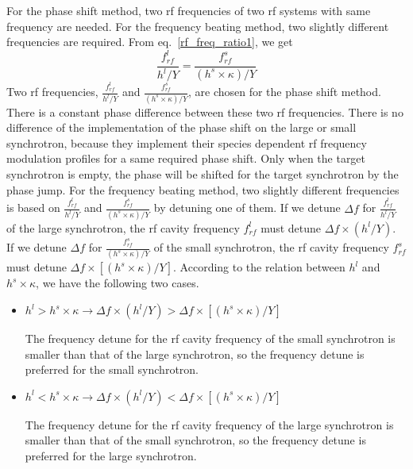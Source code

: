 For the phase shift method, two rf frequencies of two rf systems with same frequency are needed. For the frequency beating method, two slightly different frequencies are required. From eq.~\ref{rf_freq_ratio1}, we get
\begin{equation}
\frac{f_{\mathit{rf}}^{l}}{h^l/Y}= \frac{f_{\mathit{rf}}^{s}}{(h^s \times \kappa)/Y} 
\end{equation}
Two rf frequencies, $\frac{f_{\mathit{rf}}^{l}}{h^l/Y}$ and $\frac{f_{\mathit{rf}}^{s}}{(h^s\times \kappa)/Y}$, are chosen for the phase shift method. There is a constant phase difference between these two rf frequencies. There is no difference of the implementation of the phase shift on the large or small synchrotron, because they implement their species dependent rf frequency modulation profiles for a same required phase shift. Only when the target synchrotron is empty, the phase will be shifted for the target synchrotron by the phase jump. For the frequency beating method, two slightly different frequencies is based on $\frac{f_{\mathit{rf}}^{l}}{h^l/Y}$ and $\frac{f_{\mathit{rf}}^{s}}{(h^s\times \kappa)/Y}$ by detuning one of them. If we detune $\Delta f$ for $\frac{f_{\mathit{rf}}^{l}}{h^l/Y}$ of the large synchrotron, the rf cavity frequency $ f_{\mathit{rf}}^{l}$ must detune $\Delta f \times (h^l/Y)$. If we detune $\Delta f$ for $\frac{f_{\mathit{rf}}^{s}}{(h^s \times \kappa)/Y}$ of the small synchrotron, the rf cavity frequency $ f_{\mathit{rf}}^{s}$ must detune $\Delta f \times [(h^s \times \kappa)/Y]$. According to the relation between $h^l$ and $h^s \times \kappa$, we have the following two cases.
\begin{itemize}
	\item $h^l > h^s \times \kappa \rightarrow \Delta f \times (h^l/Y) > \Delta f \times [(h^s \times \kappa)/Y]$ 

The frequency detune for the rf cavity frequency of the small synchrotron is smaller than that of the large synchrotron, so the frequency detune is preferred for the small synchrotron.
	\item $h^l < h^s \times \kappa \rightarrow \Delta f \times (h^l/Y) < \Delta f \times [(h^s \times \kappa)/Y]$

The frequency detune for the rf cavity frequency of the large synchrotron is smaller than that of the small synchrotron, so the frequency detune is preferred for the large synchrotron.
\end{itemize}

